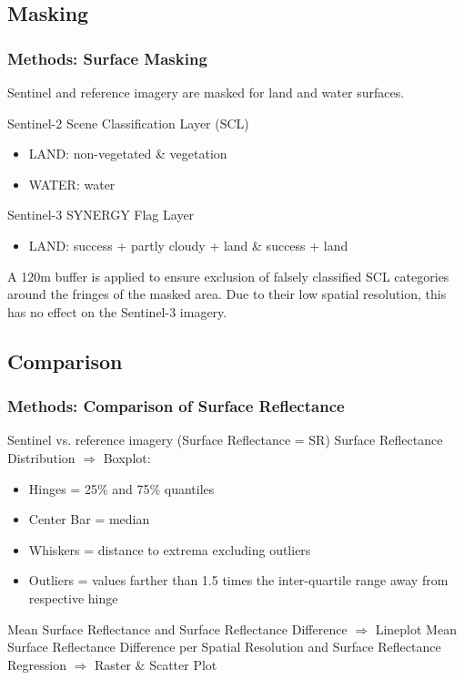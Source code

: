 \documentclass[9pt]{beamer}
\begin{document}
\subsection{Masking}
\begin{frame}
\frametitle{Methods: Surface Masking}
Sentinel and reference imagery are masked for land and water surfaces.
\begin{block}{Sentinel-2}
Scene Classification Layer (SCL)
\begin{itemize}
\item LAND: non-vegetated \& vegetation
\item WATER: water
\end{itemize}
\end{block}
\begin{alertblock}{Sentinel-3}
SYNERGY Flag Layer
\begin{itemize}
\item LAND: success + partly cloudy + land \& success + land
\end{itemize}
\end{alertblock}
A 120m buffer is applied to ensure exclusion of falsely classified SCL categories around the fringes of the masked area. Due to their low spatial resolution, this has no effect on the Sentinel-3 imagery.
\end{frame}

\subsection{Comparison}
\begin{frame}
\frametitle{Methods: Comparison of Surface Reflectance}
Sentinel vs. reference imagery      (Surface Reflectance = SR)\newline\newline
Surface Reflectance Distribution $\Rightarrow$ Boxplot:
\begin{itemize}
\item\scriptsize Hinges = 25\% and 75\% quantiles
\item\scriptsize Center Bar = median
\item\scriptsize Whiskers = distance to extrema excluding outliers
\item\scriptsize Outliers = values farther than 1.5 times the inter-quartile range away from respective hinge\newline 
\end{itemize}
Mean Surface Reflectance and Surface Reflectance Difference $\Rightarrow$ Lineplot\newline\newline
Mean Surface Reflectance Difference per Spatial Resolution and\newline
Surface Reflectance Regression $\Rightarrow$ Raster \& Scatter Plot
\end{frame}
\end{document}
